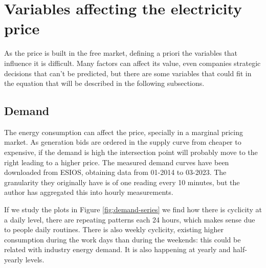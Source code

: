 \section{Variables affecting the electricity price}
As the price is built in the free market, defining a priori the variables that influence it is difficult.
Many factors can affect its value, even companies strategic decisions that can't be predicted, but there are some variables that could fit in the equation that will be described in the following subsections. \cite{mercado-electrico-periodico-energia, mercado-electrico-cambio-energetico}

\subsection{Demand}
The energy consumption can affect the price, specially in a marginal pricing market.
As generation bids are ordered in the supply curve from cheaper to expensive, if the demand is high the intersection point will probably move to the right leading to a higher price.
The measured demand curves have been downloaded from ESIOS, obtaining data from 01-2014 to 03-2023. The granularity they originally have is of one reading every 10 minutes, but the author has aggregated this into hourly measurements.

If we study the plots in Figure \ref{fig:demand-series} we find how there is cyclicity at a daily level, there are repeating patterns each 24 hours, which makes sense due to people daily routines. There is also weekly cyclicity, existing higher consumption during the work days than during the weekends: this could be related with industry energy demand. It is also happening at yearly and half-yearly levels.

